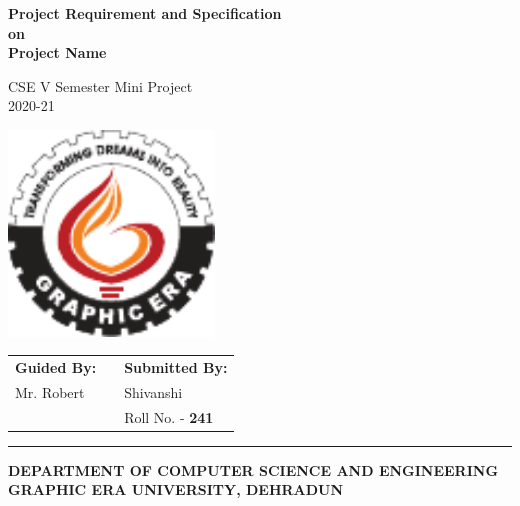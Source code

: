 \documentclass{article}
\begin{document}
\begin{center}
    \bfseries{\huge{Project Requirement and Specification}}\\
    \huge{on}\\
    \huge{Project Name}
\end{center}

\vspace{1mm}

\begin{center}
    {
        \LARGE
        CSE V Semester Mini Project\\
        2020-21
    }
\end{center}

\vspace{4mm}

\begin{center}
    \includegraphics[width=0.41\textwidth]{logo2.pdf}
\end{center}

{
\LARGE
\begin{center}
    \begin{tabular}{m{4.5cm}m{3cm}m{5cm}}
        \textbf{Guided By:} & & \textbf{Submitted By:} \\
        Mr. Robert & & Shivanshi \\
        & & Roll No. - \textbf{241} \\
    \end{tabular}
\end{center}
}

\vspace{45mm}

\noindent\rule{\textwidth}{0.4pt}

\begin{center}
{
\large
\textbf{DEPARTMENT OF COMPUTER SCIENCE AND ENGINEERING}\\
}
\vspace{3mm}
{
\LARGE
\textbf{GRAPHIC ERA UNIVERSITY, DEHRADUN}
}
\end{center}
\end{document}
